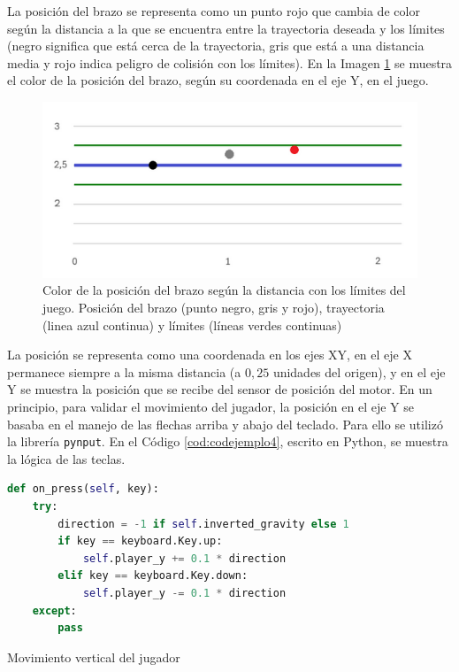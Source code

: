 La posición del brazo se representa como un punto rojo que cambia de color según la distancia a la que se encuentra entre la trayectoria deseada y los límites (negro significa que está cerca de la trayectoria, gris que está a una distancia media y rojo indica peligro de colisión con los límites).
En la Imagen \ref{fig:colors} se muestra el color de la posición del brazo, según su coordenada en el eje Y, en el juego.
\begin{figure}[ht!]
	\centering
	\begin{minipage}{0.65\linewidth}
		\centering
		\includegraphics[width=\linewidth]{figs/position_colors.png}
	\end{minipage}
	\caption[Color de la posición del brazo según la distancia con los límites del juego]{Color de la posición del brazo según la distancia con los límites del juego.
	Posición del brazo (punto negro, gris y rojo), trayectoria (linea azul continua) y límites (líneas verdes continuas)}
	\label{fig:colors}
\end{figure}

La posición se representa como una coordenada en los ejes XY, en el eje X permanece siempre a la misma distancia (a $0,25$ unidades del origen), y en el eje Y se muestra la posición que se recibe del sensor de posición del motor.
En un principio, para validar el movimiento del jugador, la posición en el eje Y se basaba en el manejo de las flechas arriba y abajo del teclado.
Para ello se utilizó la librería \verb|pynput|.
En el Código \ref{cod:codejemplo4}, escrito en Python, se muestra la lógica de las teclas.

\begin{code}[h]
\begin{lstlisting}[language=Python]
def on_press(self, key):
	try:
		direction = -1 if self.inverted_gravity else 1
		if key == keyboard.Key.up:
			self.player_y += 0.1 * direction
		elif key == keyboard.Key.down:
			self.player_y -= 0.1 * direction
	except:
		pass
\end{lstlisting}
\caption[Movimiento vertical del jugador]{Movimiento vertical del jugador}
\label{cod:codejemplo4}
\end{code}

